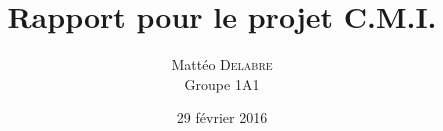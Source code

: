 \documentclass{report}
\begin{document}
\title{Rapport pour le projet C.M.I.}
\date{29 février 2016}
\author{Mattéo \textsc{Delabre}\\Groupe 1A1}
\maketitle

\setcounter{tocdepth}{1}
\tableofcontents

\setlength{\parskip}{0.4cm plus4mm minus3mm}








\cleardoublepage
{}
{}


\end{document}
